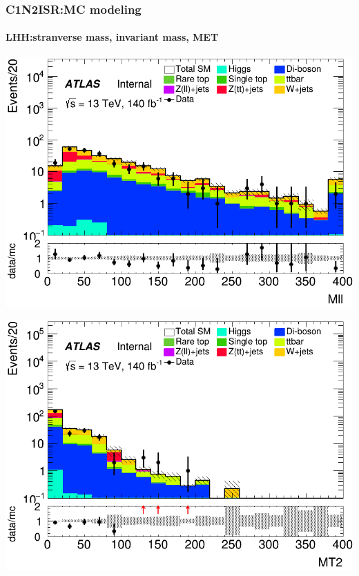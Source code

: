 \documentclass[usenames,dvipsnames]{beamer}
\begin{document}
\begin{frame}
\frametitle{C1N2ISR:MC modeling}
\framesubtitle{LHH:\quad stranverse mass, invariant mass, MET}
    \begin{minipage}{0.32\textwidth}
        \centering
        \includegraphics[width=\textwidth]{graphics/LHH_met/LHH_met_Mll.png}
    \end{minipage}
    \hfill
    \begin{minipage}{0.32\textwidth}
        \centering
        \includegraphics[width=\textwidth]{graphics/LHH_met/LHH_met_MT2.png}
    \end{minipage}
    \hfill
    

\end{frame}
\end{document}
